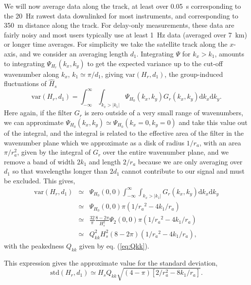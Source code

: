 {We will now average data along the track, at least over 0.05~s corresponding to the 20~Hz rawest data downlinked for most instruments, and corresponding to 350~m distance along the track. For delay-only measurements, these data are fairly noisy and most users typically use at least 1~Hz data (averaged over 7~km) or longer time averages. For simplicity we take the satellite track along the $x$-axis, and we consider an averaging length $d_1$. 
Integrating $\Psi$ for $k_x > k_1$, amounts to integrating $\Psi_{H_r}(k_x,k_y)$ to get the expected variance up to the  cut-off wavenumber along $k_x$, $k_1\simeq \pi / d_1 $, giving $\mathrm{var}(H_{r},d_1)$, the group-induced fluctuations of $\widehat{H}_s$ 
\begin{equation}
\mathrm{var}(H_{r}, d_1) = \int_{-\infty}^{\infty} \int_{k_x > |k_1| } \Psi_{H_0}(k_x,k_y)  G_{r}(k_x,k_y) \mathrm{d}k_x \mathrm{d}k_y. \label{eq:varfromspec2D}
\end{equation}
Here again, if the filter $G_{r}$ is zero outside of a very small range of wavenumbers, we can approximate $\Psi_{H_0}(k_x,k_y) \simeq \Psi_{H_0}(k_x=0,k_y=0)$ and take this value out of the integral, and the integral is related to the effective area of the filter in the wavenumber plane which we approximate as a disk of radius $1/r_a$, with an area $\pi /r_a^2$, given by the integral of $G_{r}$ over the entire wavenumber plane, and we remove a band of width $2 k_1$ and length $2/r_a$ because we are only averaging over $d_1$ so that wavelengths longer than $2 d_1$ cannot contribute to our signal and must be excluded. This gives,  
\begin{eqnarray}
    \mathrm{var}(H_{r},d_1) &\simeq&  \Psi_{H_0}(0,0)   \int_{-\infty}^{\infty} \int_{k_x > |k_1| } G_{r}(k_x,k_y) \mathrm{d}k_x \mathrm{d}k_y \nonumber \\
    &\simeq&  \Psi_{H_0}(0,0)  \pi\left(1 / {r_a}^2 - 4 k_1/ r_a \right) \nonumber\\
    &\simeq&  \frac{32}{\pi} \frac{8 - 2\pi}{H_s^2}   \Psi_2(0,0)   \pi  \left(1 / {r_a}^2 - 4 k_1/ r_a \right) \nonumber\\
    &\simeq&   Q_{kk}^2 H_s^2(8 - 2 \pi) \left(1 / {r_a}^2 - 4 k_1/ r_a \right)  , 
\end{eqnarray}
with the peakedness $Q_{kk}$ given by eq. (\ref{eq:Qkk}). 



This expression gives the approximate value for the standard deviation,
\begin{equation}
    \mathrm{std}(H_{r},d_1) \simeq  H_s   Q_{kk}  \sqrt{ (4-\pi) \left[2/r_a^2 -  8 k_1 / r_a\right] }.\label{eq:std_Hs_from_Qkk}
\end{equation}

}
